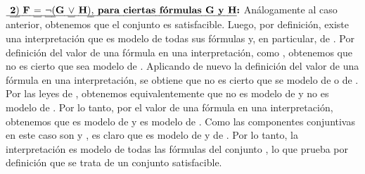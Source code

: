 \begin{isabellebody}
\begin{isamarkuptext}
\begin{demostracion}
      $\textbf{\isa{{\isasymtwo}{\isacharparenright}\ F\ {\isacharequal}\ {\isasymnot}{\isacharparenleft}G\ {\isasymor}\ H{\isacharparenright}{\isacharcomma}\ para\ ciertas\ fórmulas\ G\ y\ H}:}$ Análogamente al caso anterior, obtenemos 
      que el conjunto  es satisfacible. Luego, por definición, existe una interpretación 
      \isa{{\isasymA}} que es modelo de todas sus fórmulas y, en particular, de . Por definición del valor de 
      una fórmula en una interpretación, como , obtenemos que no es cierto que \isa{{\isasymA}} 
      sea modelo de . Aplicando de nuevo la definición del valor de una fórmula en una 
      interpretación, se obtiene que no es cierto que \isa{{\isasymA}} se modelo de  o de . Por las leyes 
      de , obtenemos equivalentemente que \isa{{\isasymA}} no es modelo de  y \isa{{\isasymA}} no es modelo de . 
      Por lo tanto, por el valor de una fórmula en una interpretación, obtenemos que \isa{{\isasymA}} es 
      modelo de  y \isa{{\isasymA}} es modelo de . Como las componentes conjuntivas en este caso son 
       y , es claro que \isa{{\isasymA}} es modelo de  y de . Por lo tanto, la 
      interpretación \isa{{\isasymA}} es modelo de todas las fórmulas del conjunto , lo que 
      prueba por definición que se trata de un conjunto satisfacible. 


\end{demostracion}
\end{isamarkuptext}
\end{isabellebody}

